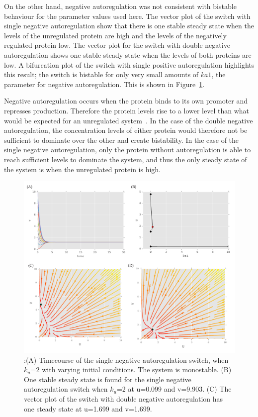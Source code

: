On the other hand, negative autoregulation was not consistent with bistable behaviour for the parameter values used here. The vector plot of the switch with single negative autoregulation show that there is one stable steady state when the levels of the unregulated protein are high and the levels of the negatively regulated protein low. The vector plot for the switch with double negative autoregulation shows one stable steady state when the levels of both proteins are low. A bifurcation plot of the switch with single positive autoregulation highlights this result; the switch is bistable for only very small amounts of $ka1$, the parameter for negative autoregulation. This is shown in Figure~\ref{fig:Gard_neg}.

Negative autoregulation occurs when the protein binds to its own promoter and represses production. Therefore the protein levels rise to a lower level than what would be expected for an unregulated system~\autocite{Alon:2007}. In the case of the double negative autoregulation, the concentration levels of either protein would therefore not be sufficient to dominate over the other and create bistability. In the case of the single negative autoregulation, only the protein without autoregulation is able to reach sufficient levels to dominate the system, and thus the only steady state of the system is when the unregulated protein is high.


\begin{figure}[htbp]
\centerfloat
\includegraphics[scale=0.7]{../../chapters/chapterABCSysBio/images/gard_neg.pdf}
\caption[Phase plane and bifurcation analysis of the switch with negative autoregulation]{\label{fig:Gard_neg}:(A) Timecourse of the single negative autoregulation switch, when $k_u$=2 with varying initial conditions. The system is monostable. (B) One stable steady state is found for the single negative autoregulation switch when $k_u$=2 at u=0.099 and v=9.903. (C) The vector plot of the switch with double negative autoregulation has one steady state at u=1.699 and v=1.699.}

\end{figure}
\clearpage

